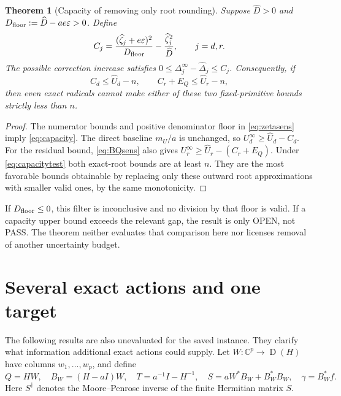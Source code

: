 \documentclass[11pt,a4paper]{article}
\newcommand{\C}{\mathbb C}
\newcommand{\Dom}{\operatorname{D}}
\newcommand{\pass}{\textsf{PASS}}
\newcommand{\open}{\textsf{OPEN}}
\newtheorem{theorem}{Theorem}[section]
\theoremstyle{definition}
\theoremstyle{remark}
\numberwithin{equation}{section}
\begin{document}
\begin{theorem}[Capacity of removing only root rounding]\label{thm:precision}
Suppose $\widehat D>0$ and
$D_{\rm floor}:=\widehat D-ae\varepsilon>0$. Define
\begin{equation}\label{eq:capacity}
 C_j=\frac{(\widehat\zeta_j+e\varepsilon)^2}{D_{\rm floor}}
                     -\frac{\widehat\zeta_j^2}{\widehat D},
 \qquad j=d,r.
\end{equation}
The possible correction increase satisfies
$0\le\Delta_j^\infty-\widehat\Delta_j\le C_j$.
Consequently, if
\begin{equation}\label{eq:capacitytest}
 C_d\le\widehat U_d-n,\qquad
 C_r+E_Q\le\widehat U_r-n,
\end{equation}
then even exact radicals cannot make either of these two
\emph{fixed-primitive} bounds strictly less than $n$.
\end{theorem}
\begin{proof}
The numerator bounds and positive denominator floor in
\eqref{eq:zetasens} imply \eqref{eq:capacity}.
The direct baseline $m_U/a$ is unchanged, so
$U_d^\infty\ge\widehat U_d-C_d$.
For the residual bound, \eqref{eq:BQsens} also gives
$U_r^\infty\ge\widehat U_r-(C_r+E_Q)$.
Under \eqref{eq:capacitytest} both exact-root bounds are at least $n$.
They are the most favorable bounds obtainable by replacing only these
outward root approximations with smaller valid ones, by the same
monotonicity.
\end{proof}

If $D_{\rm floor}\le0$, this filter is inconclusive and no division by
that floor is valid. If a capacity upper bound exceeds the relevant gap,
the result is only \open, not \pass. The theorem neither evaluates that
comparison here nor licenses removal of another uncertainty budget.

\section{Several exact actions and one target}\label{sec:higherrank}

The following results are also unevaluated for the saved instance.
They clarify what information additional exact actions could supply.
Let $W:\C^p\to\Dom(H)$ have columns $w_1,\ldots,w_p$, and define
\begin{equation}\label{eq:higherdefs}
 Q=HW,\quad B_{\!W}=(H-aI)W,\quad
 T=a^{-1}I-H^{-1},\quad
 S=aW^*B_{\!W}+B_{\!W}^*B_{\!W},\quad
 \gamma=B_{\!W}^*f .
\end{equation}
Here $S^\dagger$ denotes the Moore--Penrose inverse of the finite
Hermitian matrix $S$.
\end{document}

